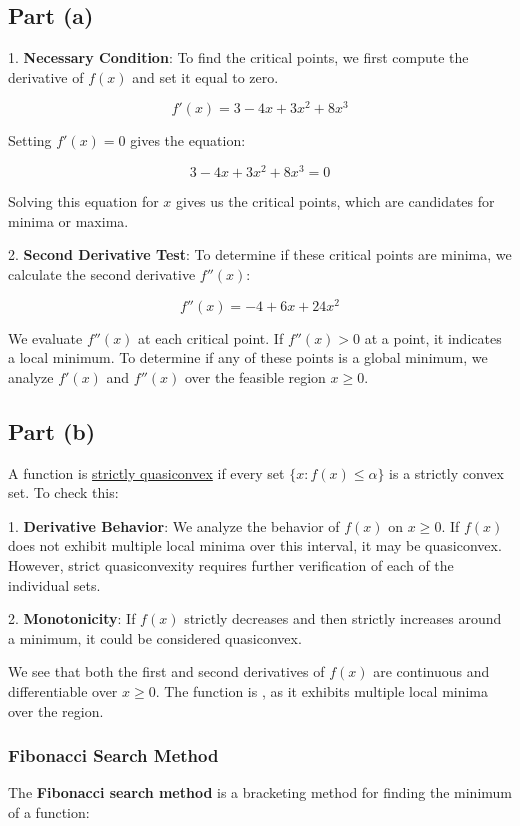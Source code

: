 \documentclass{article}
\begin{document}
\subsection*{Part (a)}

1. \textbf{Necessary Condition}: To find the critical points, we first compute the derivative of \( f(x) \) and set it equal to zero.

   \[
   f'(x) = 3 - 4x + 3x^2 + 8x^3
   \]
   
   Setting \( f'(x) = 0 \) gives the equation:
   
   \[
   3 - 4x + 3x^2 + 8x^3 = 0
   \]
   
   Solving this equation for \( x \) gives us the critical points, which are candidates for minima or maxima.

2. \textbf{Second Derivative Test}: To determine if these critical points are minima, we calculate the second derivative \( f''(x) \):

   \[
   f''(x) = -4 + 6x + 24x^2
   \]

   We evaluate \( f''(x) \) at each critical point. If \( f''(x) > 0 \) at a point, it indicates a local minimum. To determine if any of these points is a global minimum, we analyze \( f'(x) \) and \( f''(x) \) over the feasible region \( x \geq 0 \).

\subsection*{Part (b)}

A function is \underline{strictly quasiconvex} if every set \( \{ x : f(x) \leq \alpha \} \) is a strictly convex set. To check this:

1. \textbf{Derivative Behavior}: We analyze the behavior of \( f(x) \) on \( x \geq 0 \). If \( f(x) \) does not exhibit multiple local minima over this interval, it may be quasiconvex. However, strict quasiconvexity requires further verification of each of the individual sets.

2. \textbf{Monotonicity}: If \( f(x) \) strictly decreases and then strictly increases around a minimum, it could be considered quasiconvex.

We see that both the first and second derivatives of \( f(x) \) are continuous and differentiable over \( x \geq 0 \). The function is , as it exhibits multiple local minima over the region.

\subsubsection*{Fibonacci Search Method}
The \textbf{Fibonacci search method} is a bracketing method for finding the minimum of a function:
\end{document}
